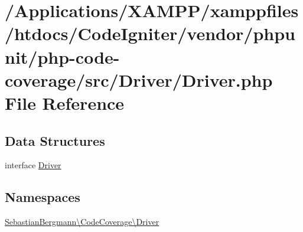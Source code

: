 \hypertarget{vendor_2phpunit_2php-code-coverage_2src_2_driver_2_driver_8php}{}\section{/\+Applications/\+X\+A\+M\+P\+P/xamppfiles/htdocs/\+Code\+Igniter/vendor/phpunit/php-\/code-\/coverage/src/\+Driver/\+Driver.php File Reference}
\label{vendor_2phpunit_2php-code-coverage_2src_2_driver_2_driver_8php}
\subsection*{Data Structures}
\begin{DoxyCompactItemize}
\item 
interface \mbox{\hyperlink{interface_sebastian_bergmann_1_1_code_coverage_1_1_driver_1_1_driver}{Driver}}
\end{DoxyCompactItemize}
\subsection*{Namespaces}
\begin{DoxyCompactItemize}
\item 
 \mbox{\hyperlink{namespace_sebastian_bergmann_1_1_code_coverage_1_1_driver}{Sebastian\+Bergmann\textbackslash{}\+Code\+Coverage\textbackslash{}\+Driver}}
\end{DoxyCompactItemize}
